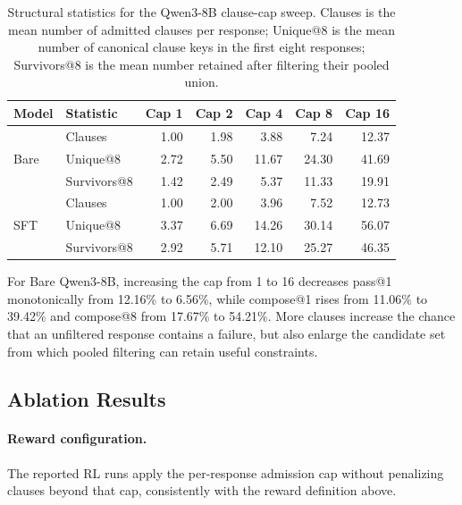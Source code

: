 \begin{table}[H]
\centering
\small
\setlength{\tabcolsep}{5pt}
\caption{Structural statistics for the Qwen3-8B clause-cap sweep.  Clauses
  is the mean number of admitted clauses per response; Unique@8 is the mean
  number of canonical clause keys in the first eight responses; Survivors@8 is
  the mean number retained after filtering their pooled union.}
\label{tab:clause-cap-structure}
\begin{tabular}{llrrrrr}
\toprule
\rowcolor{algobg}
Model & Statistic & Cap 1 & Cap 2 & Cap 4 & Cap 8 & Cap 16 \\
\midrule
\multirow{3}{*}{Bare}
 & Clauses       & 1.00 & 1.98 & 3.88 & 7.24 & 12.37 \\
 & Unique@8      & 2.72 & 5.50 & 11.67 & 24.30 & 41.69 \\
 & Survivors@8   & 1.42 & 2.49 & 5.37 & 11.33 & 19.91 \\
\midrule
\multirow{3}{*}{SFT}
 & Clauses       & 1.00 & 2.00 & 3.96 & 7.52 & 12.73 \\
 & Unique@8      & 3.37 & 6.69 & 14.26 & 30.14 & 56.07 \\
 & Survivors@8   & 2.92 & 5.71 & 12.10 & 25.27 & 46.35 \\
\bottomrule
\end{tabular}
\end{table}

For Bare Qwen3-8B, increasing the cap from 1 to 16 decreases pass@1
monotonically from 12.16\% to 6.56\%, while compose@1 rises from 11.06\% to
39.42\% and compose@8 from 17.67\% to 54.21\%.  More clauses increase the
chance that an unfiltered response contains a failure, but also enlarge the
candidate set from which pooled filtering can retain useful constraints.

\subsection{Ablation Results}
\label{app:ablation-definitions}

\paragraph{Reward configuration.}
The reported RL runs apply the per-response admission cap without penalizing
clauses beyond that cap, consistently with the reward definition above.

